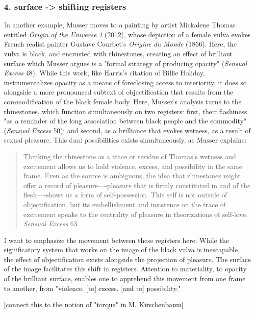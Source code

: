 \documentclass[11pt]{article}
\begin{document}
\subsubsection{4. surface -> shifting registers}
\label{sec:orgd440e40}
In another example, Musser moves to a painting by artist Mickalene
Thomas entitled \emph{Origin of the Universe 1} (2012), whose depiction of
a female vulva evokes French realist painter Gustave Courbet's
\emph{Origine du Monde} (1866). Here, the vulva is black, and encrusted
with rhinestones, creating an effect of brilliant surface which Musser
argues is a "formal strategy of producing opacity" (\emph{Sensual Excess}
48). While this work, like Harris's citation of Billie Holiday,
instrumentalizes opacity as a means of foreclosing access to
interiority, it does so alongside a more pronounced subtext of
objectification that results from the commodification of the black
female body. Here, Musser's analysis turns to the rhinestones, which
function simultaneously on two registers: first, their flashiness "as
a reminder of the long association between black people and the
commodity" (\emph{Sensual Excess} 50); and second, as a brilliance that
evokes wetness, as a result of sexual pleasure. This dual possibilities
exists simultaneously, as Musser explains:
\begin{quote}
Thinking the rhinestone as a trace or residue of Thomas’s wetness and
excitement allows us to hold violence, excess, and possibility in the
same frame. Even as the source is ambiguous, the idea that rhinestones
might offer a record of pleasure—-pleasure that is firmly constituted
in and of the flesh—-shows us a form of self-possession.  This self is
not outside of objectification, but its embellishment and insistence
on the trace of excitement speaks to the centrality of pleasure in
theorizations of self-love. \emph{Sensual Excess} 63
\end{quote}
I want to emphasize the movement between these registers here. While
the significatory system that works on the image of the black vulva is
inescapable, the effect of objectification exists alongside the
projection of pleasure. The surface of the image facilitates this
shift in registers. Attention to materiality, to opacity of the
brilliant surface, enables one to apprehend this movement from one
frame to another, from "violence, [to] excess, [and to] possibility."

[connect this to the notion of "torque" in M. Kirschenbaum]
\end{document}
